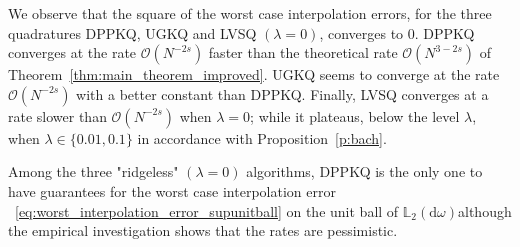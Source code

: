 \documentclass[twoside,11pt]{book}
\numberwithin{theorem}{chapter}
\numberwithin{definition}{chapter}
\numberwithin{proposition}{chapter}
\numberwithin{corollary}{chapter}
\numberwithin{example}{chapter}
\numberwithin{lemma}{chapter}
\numberwithin{assumption}{chapter}
\numberwithin{equation}{chapter}
\numberwithin{figure}{chapter}
\begin{document}
We observe that the square of the worst case interpolation errors, for the three quadratures DPPKQ, UGKQ and LVSQ $(\lambda = 0)$, converges  to $0$. DPPKQ converges at the rate $\mathcal{O}(N^{-2s})$ faster than the theoretical rate $\mathcal{O}(N^{3-2s})$ of Theorem~\ref{thm:main_theorem_improved}. UGKQ seems to converge at the rate $\mathcal{O}(N^{-2s})$ with a better constant than DPPKQ. Finally, LVSQ converges at a rate slower than $\mathcal{O}(N^{-2s})$ when $\lambda =0$; while it plateaus, below the level $\lambda$, when $\lambda \in \{0.01, 0.1 \}$ in accordance with Proposition~\ref{p:bach}.

Among the three "ridgeless" $(\lambda = 0)$ algorithms, DPPKQ is the only one to have guarantees for the worst case interpolation error ~\eqref{eq:worst_interpolation_error_supunitball}  on the unit ball of $\mathbb{L}_{2}(\mathrm{d}\omega)$although the empirical investigation shows that the rates are pessimistic.
\end{document}
